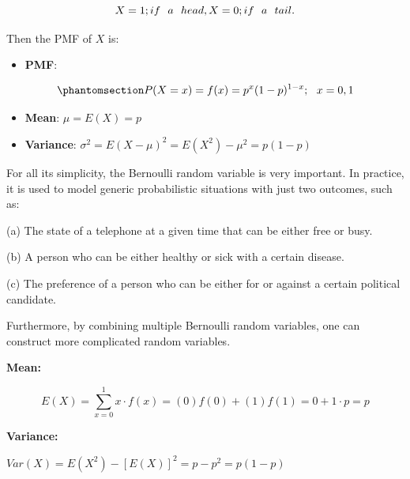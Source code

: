 \documentclass[
  11pt,
  letterpaper,
  DIV=11,
  numbers=noendperiod]{scrreprt}
\providecommand{\tightlist}{%
  \setlength{\itemsep}{0pt}\setlength{\parskip}{0pt}}
\begin{document}
\[X=1 ; if \ \  a \ \ head,\\
X=0 ;  if\ \  a \ \ tail.\]

Then the PMF of \(X\) is:

\begin{itemize}
\tightlist
\item
  \textbf{PMF}:
\end{itemize}

\begin{equation}\phantomsection\label{eq-bernoulli}{P(X=x)=f(x)=p^x(1-p)^{1-x}; \ \ x=0,1}\end{equation}

\begin{itemize}
\item
  \textbf{Mean}: \(\mu=E(X)=p\)
\item
  \textbf{Variance}: \(\sigma^2 =E(X-\mu)^2=E(X^2)-\mu^2=p(1-p)\)
\end{itemize}

For all its simplicity, the Bernoulli random variable is very important.
In practice, it is used to model generic probabilistic situations with
just two outcomes, such as:

(a) The state of a telephone at a given time that can be either free or
busy.

(b) A person who can be either healthy or sick with a certain disease.

(c) The preference of a person who can be either for or against a
certain political candidate.

Furthermore, by combining multiple Bernoulli random variables, one can
construct more complicated random variables.

\begin{tcolorbox}[enhanced jigsaw, bottomrule=.15mm, toprule=.15mm, title=\textcolor{quarto-callout-note-color}{\faInfo}\hspace{0.5em}{Derivation of Mean and Variance of Bernoulli r.v}, bottomtitle=1mm, colframe=quarto-callout-note-color-frame, coltitle=black, rightrule=.15mm, toptitle=1mm, colbacktitle=quarto-callout-note-color!10!white, titlerule=0mm, breakable, arc=.35mm, leftrule=.75mm, opacitybacktitle=0.6, opacityback=0, colback=white, left=2mm]

\textbf{Mean:}

\[E(X)=\sum_{x=0}^1 x\cdot f(x)=(0) f(0)+(1)f(1)=0+1\cdotp p=p\]

\textbf{Variance:}

\(Var(X)=E(X^2)-[E(X)]^2=p-p^2=p(1-p)\)

\end{tcolorbox}
\end{document}
